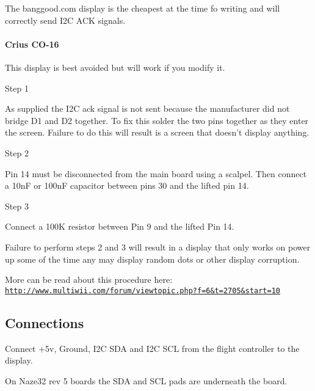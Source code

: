 The banggood.\+com display is the cheapest at the time fo writing and will correctly send I2\+C A\+C\+K signals.

\paragraph*{Crius C\+O-\/16}

This display is best avoided but will work if you modify it.

Step 1

As supplied the I2\+C ack signal is not sent because the manufacturer did not bridge D1 and D2 together. To fix this solder the two pins together as they enter the screen. Failure to do this will result is a screen that doesn't display anything.

Step 2

Pin 14 must be disconnected from the main board using a scalpel. Then connect a 10n\+F or 100n\+F capacitor between pins 30 and the lifted pin 14.

Step 3

Connect a 100\+K resistor between Pin 9 and the lifted Pin 14.

Failure to perform steps 2 and 3 will result in a display that only works on power up some of the time any may display random dots or other display corruption.

More can be read about this procedure here\+: \href{http://www.multiwii.com/forum/viewtopic.php?f=6&t=2705&start=10}{\tt http\+://www.\+multiwii.\+com/forum/viewtopic.\+php?f=6\&t=2705\&start=10}

 

\subsection*{Connections}

Connect +5v, Ground, I2\+C S\+D\+A and I2\+C S\+C\+L from the flight controller to the display.

On Naze32 rev 5 boards the S\+D\+A and S\+C\+L pads are underneath the board. 